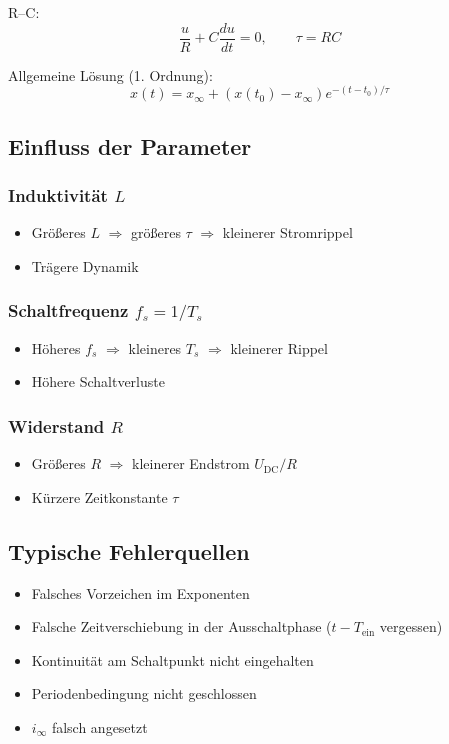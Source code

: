 R--C:
\[
\frac{u}{R} + C \frac{du}{dt} = 0,
\qquad \tau = R C
\]

Allgemeine Lösung (1. Ordnung):
\[
x(t) = x_\infty + (x(t_0)-x_\infty)e^{-(t-t_0)/\tau}
\]

\subsection{Einfluss der Parameter}

\subsubsection{Induktivität $L$}
\begin{itemize}
    \item Größeres $L$ $\Rightarrow$ größeres $\tau$ $\Rightarrow$ kleinerer Stromrippel
    \item Trägere Dynamik
\end{itemize}

\subsubsection{Schaltfrequenz $f_s = 1/T_s$}
\begin{itemize}
    \item Höheres $f_s$ $\Rightarrow$ kleineres $T_s$ $\Rightarrow$ kleinerer Rippel
    \item Höhere Schaltverluste
\end{itemize}

\subsubsection{Widerstand $R$}
\begin{itemize}
    \item Größeres $R$ $\Rightarrow$ kleinerer Endstrom $U_{\mathrm{DC}}/R$
    \item Kürzere Zeitkonstante $\tau$
\end{itemize}

\subsection{Typische Fehlerquellen}



\begin{itemize}
    \item Falsches Vorzeichen im Exponenten
    \item Falsche Zeitverschiebung in der Ausschaltphase ($t-T_{\mathrm{ein}}$ vergessen)
    \item Kontinuität am Schaltpunkt nicht eingehalten
    \item Periodenbedingung nicht geschlossen
    \item $i_\infty$ falsch angesetzt
\end{itemize}

